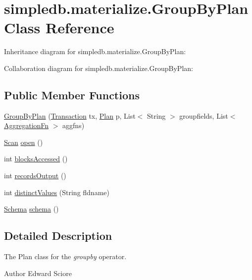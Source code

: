 \hypertarget{classsimpledb_1_1materialize_1_1GroupByPlan}{}\section{simpledb.\+materialize.\+Group\+By\+Plan Class Reference}
\label{classsimpledb_1_1materialize_1_1GroupByPlan}


Inheritance diagram for simpledb.\+materialize.\+Group\+By\+Plan\+:


Collaboration diagram for simpledb.\+materialize.\+Group\+By\+Plan\+:
\subsection*{Public Member Functions}
\begin{DoxyCompactItemize}
\item 
\hyperlink{classsimpledb_1_1materialize_1_1GroupByPlan_a5290c34a04ce9ae4758742b9a20dfd2d}{Group\+By\+Plan} (\hyperlink{classsimpledb_1_1tx_1_1Transaction}{Transaction} tx, \hyperlink{interfacesimpledb_1_1plan_1_1Plan}{Plan} p, List$<$ String $>$ groupfields, List$<$ \hyperlink{interfacesimpledb_1_1materialize_1_1AggregationFn}{Aggregation\+Fn} $>$ aggfns)
\item 
\hyperlink{interfacesimpledb_1_1query_1_1Scan}{Scan} \hyperlink{classsimpledb_1_1materialize_1_1GroupByPlan_a2f4aa5e9b356af297091a27ff2b97343}{open} ()
\item 
int \hyperlink{classsimpledb_1_1materialize_1_1GroupByPlan_a741eec5aa2c6dc59f1814a4268a3af46}{blocks\+Accessed} ()
\item 
int \hyperlink{classsimpledb_1_1materialize_1_1GroupByPlan_aac232f69ae5b322754b34f83c4813883}{records\+Output} ()
\item 
int \hyperlink{classsimpledb_1_1materialize_1_1GroupByPlan_ac7d2a7c034341a5c032a1247a297ec1e}{distinct\+Values} (String fldname)
\item 
\hyperlink{classsimpledb_1_1record_1_1Schema}{Schema} \hyperlink{classsimpledb_1_1materialize_1_1GroupByPlan_a2060788080c03855f35d72a1742e6ec6}{schema} ()
\end{DoxyCompactItemize}


\subsection{Detailed Description}
The Plan class for the {\itshape groupby} operator. \begin{DoxyAuthor}{Author}
Edward Sciore 
\end{DoxyAuthor}


